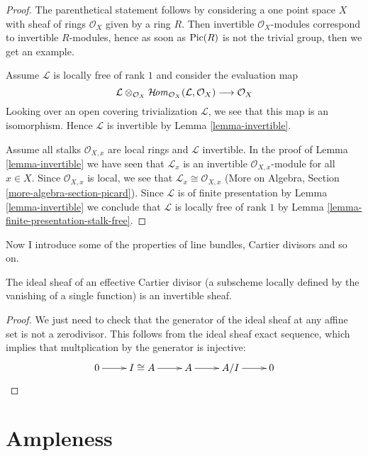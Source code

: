 \begin{proof}
The parenthetical statement follows by considering a one point
space $X$ with sheaf of rings $\mathcal{O}_X$ given by a ring $R$.
Then invertible $\mathcal{O}_X$-modules correspond to invertible
$R$-modules, hence as soon as $\mathop{\mathrm{Pic}}\nolimits(R)$ is not the trivial group,
then we get an example.

\medskip\noindent
Assume $\mathcal{L}$ is locally free of rank $1$ and consider the
evaluation map
$$
\mathcal{L} \otimes_{\mathcal{O}_X}
\mathop{\mathcal{H}\!\mathit{om}}\nolimits_{\mathcal{O}_X}(\mathcal{L}, \mathcal{O}_X)
\longrightarrow \mathcal{O}_X
$$
Looking over an open covering trivialization $\mathcal{L}$, we see
that this map is an isomorphism. Hence $\mathcal{L}$ is invertible
by Lemma \ref{lemma-invertible}.

\medskip\noindent
Assume all stalks $\mathcal{O}_{X, x}$ are local rings and $\mathcal{L}$
invertible. In the proof of Lemma \ref{lemma-invertible}
we have seen that $\mathcal{L}_x$ is an invertible
$\mathcal{O}_{X, x}$-module for all $x \in X$. Since
$\mathcal{O}_{X, x}$ is local, we see that
$\mathcal{L}_x \cong \mathcal{O}_{X, x}$
(More on Algebra, Section \ref{more-algebra-section-picard}).
Since $\mathcal{L}$ is of finite presentation by
Lemma \ref{lemma-invertible} we conclude that $\mathcal{L}$
is locally free of rank $1$ by
Lemma \ref{lemma-finite-presentation-stalk-free}.
\end{proof}

Now I introduce some of the properties of line bundles, Cartier divisors and so
on.

\begin{lemma}
\label{lemma-Cartier-effective-and-invertible-sheaf}
The ideal sheaf of an effective Cartier divisor (a subscheme locally defined by
the vanishing of a single function) is an invertible sheaf.
\end{lemma}

\begin{proof}
We just need to check that the generator of the ideal sheaf at any affine set is
not a zerodivisor. This follows from the ideal sheaf exact sequence, which
implies that multplication by the generator is injective:
 $$
\xymatrix{
0\ar[r]&I\cong A\ar[r]&A\ar[r]&A/I\ar[r]&0
}
$$
\end{proof}


\section{Ampleness}
\label{section-ampleness}

